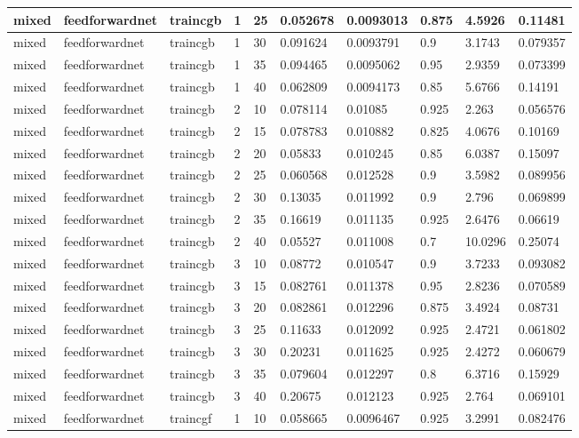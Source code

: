 \begin{longtable}{lllllllll}
mixed & feedforwardnet & traincgb & 1 & 25 & 0.052678 & 0.0093013 & 0.875 & 4.5926 & 0.11481 \\ \hline 
mixed & feedforwardnet & traincgb & 1 & 30 & 0.091624 & 0.0093791 & 0.9 & 3.1743 & 0.079357 \\ \hline 
mixed & feedforwardnet & traincgb & 1 & 35 & 0.094465 & 0.0095062 & 0.95 & 2.9359 & 0.073399 \\ \hline 
mixed & feedforwardnet & traincgb & 1 & 40 & 0.062809 & 0.0094173 & 0.85 & 5.6766 & 0.14191 \\ \hline 
mixed & feedforwardnet & traincgb & 2 & 10 & 0.078114 & 0.01085 & 0.925 & 2.263 & 0.056576 \\ \hline 
mixed & feedforwardnet & traincgb & 2 & 15 & 0.078783 & 0.010882 & 0.825 & 4.0676 & 0.10169 \\ \hline 
mixed & feedforwardnet & traincgb & 2 & 20 & 0.05833 & 0.010245 & 0.85 & 6.0387 & 0.15097 \\ \hline 
mixed & feedforwardnet & traincgb & 2 & 25 & 0.060568 & 0.012528 & 0.9 & 3.5982 & 0.089956 \\ \hline 
mixed & feedforwardnet & traincgb & 2 & 30 & 0.13035 & 0.011992 & 0.9 & 2.796 & 0.069899 \\ \hline 
mixed & feedforwardnet & traincgb & 2 & 35 & 0.16619 & 0.011135 & 0.925 & 2.6476 & 0.06619 \\ \hline 
mixed & feedforwardnet & traincgb & 2 & 40 & 0.05527 & 0.011008 & 0.7 & 10.0296 & 0.25074 \\ \hline 
mixed & feedforwardnet & traincgb & 3 & 10 & 0.08772 & 0.010547 & 0.9 & 3.7233 & 0.093082 \\ \hline 
mixed & feedforwardnet & traincgb & 3 & 15 & 0.082761 & 0.011378 & 0.95 & 2.8236 & 0.070589 \\ \hline 
mixed & feedforwardnet & traincgb & 3 & 20 & 0.082861 & 0.012296 & 0.875 & 3.4924 & 0.08731 \\ \hline 
mixed & feedforwardnet & traincgb & 3 & 25 & 0.11633 & 0.012092 & 0.925 & 2.4721 & 0.061802 \\ \hline 
mixed & feedforwardnet & traincgb & 3 & 30 & 0.20231 & 0.011625 & 0.925 & 2.4272 & 0.060679 \\ \hline 
mixed & feedforwardnet & traincgb & 3 & 35 & 0.079604 & 0.012297 & 0.8 & 6.3716 & 0.15929 \\ \hline 
mixed & feedforwardnet & traincgb & 3 & 40 & 0.20675 & 0.012123 & 0.925 & 2.764 & 0.069101 \\ \hline 
mixed & feedforwardnet & traincgf & 1 & 10 & 0.058665 & 0.0096467 & 0.925 & 3.2991 & 0.082476 \\ \hline 

\end{longtable}
